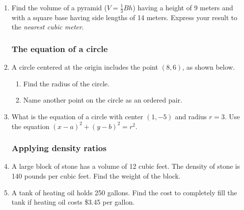 \documentclass[12pt, twoside]{article}
\begin{document}
\begin{enumerate}
  \item Find the volume of a pyramid ($V=\frac{1}{3}Bh$) having a height of 9 meters and with a square base having side lengths of 14 meters. Express your result to the \emph{nearest cubic meter}. \vspace{5cm}

\newpage
\subsubsection*{The equation of a circle}

  \item A circle centered at the origin includes the point $(8,6)$, as shown below.
  \begin{multicols}{2}
    \raggedcolumns
    \begin{enumerate}
      \item Find the radius of the circle. \vspace{2.7cm}
      \item Name another point on the circle as an ordered pair.
    \end{enumerate}
  \end{multicols}

  \item What is the equation of a circle with center $(1,-5)$ and radius $r=3$. Use the equation $(x-a)^2+(y-b)^2=r^2$. \vspace{1.5cm}
  
\subsubsection*{Applying density ratios}
  \item A large block of stone has a volume of 12 cubic feet. The density of stone is 140 pounds per cubic feet. Find the weight of the block.  \vspace{3cm}
  \item A tank of heating oil holds 250 gallons. Find the cost to completely fill the tank if heating oil costs \$3.45 per gallon. \vspace{3cm}


\end{enumerate}
\end{document}
